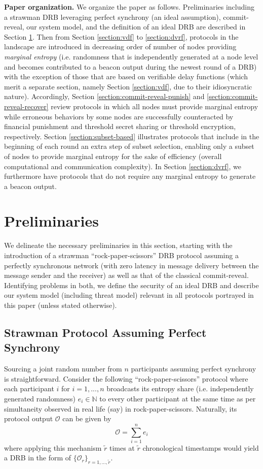\documentclass[letterpaper,twocolumn,10pt]{article}
\theoremstyle{definition}
\theoremstyle{remark}
\begin{document}
\textbf{Paper organization.} We organize the paper as follows. Preliminaries including a strawman DRB leveraging perfect synchrony (an ideal assumption), commit-reveal, our system model, and the definition of an ideal DRB are described in Section \ref{section:preliminaries}. Then from Section \ref{section:vdf} to \ref{section:dvrf}, protocols in the landscape are introduced in decreasing order of number of nodes providing \textit{marginal entropy} (i.e. randomness that is independently generated at a node level and becomes contributed to a beacon output during the newest round of a DRB) with the exception of those that are based on verifiable delay functions (which merit a separate section, namely Section \ref{section:vdf}, due to their idiosyncratic nature). Accordingly, Section \ref{section:commit-reveal-punish} and \ref{section:commit-reveal-recover} review protocols in which all nodes must provide marginal entropy while erroneous behaviors by some nodes are successfully counteracted by financial punishment and threshold secret sharing or threshold encryption, respectively. Section \ref{section:subset-based} illustrates protocols that include in the beginning of each round an extra step of subset selection, enabling only a subset of nodes to provide marginal entropy for the sake of efficiency (overall computational and communication complexity). In Section \ref{section:dvrf}, we furthermore have protocols that do not require any marginal entropy to generate a beacon output.

\section{Preliminaries}
\label{section:preliminaries}
We delineate the necessary preliminaries in this section, starting with the introduction of a strawman ``rock-paper-scissors'' DRB protocol assuming a perfectly synchronous network (with zero latency in message delivery between the message sender and the receiver) as well as that of the classical commit-reveal. Identifying problems in both, we define the security of an ideal DRB and describe our system model (including threat model) relevant in all protocols portrayed in this paper (unless stated otherwise).

\subsection{Strawman Protocol Assuming Perfect Synchrony}
Sourcing a joint random number from $n$ participants assuming perfect synchrony is straightforward. Consider the following ``rock-paper-scissors'' protocol where each participant $i$ for $i = 1, ..., n$ broadcasts its entropy share (i.e. independently generated randomness) $e_i \in \mathbb{N}$ to every other participant at the same time as per simultaneity observed in real life (say) in rock-paper-scissors. Naturally, its protocol output $\mathcal{O}$ can be given by
\[
\mathcal{O} = \sum_{i = 1}^n e_i
\]
where applying this mechanism $\tilde{r}$ times at $\tilde{r}$ chronological timestamps would yield a DRB in the form of $\{\mathcal{O}_r\}_{r = 1, ..., \tilde{r}}$.
\end{document}
